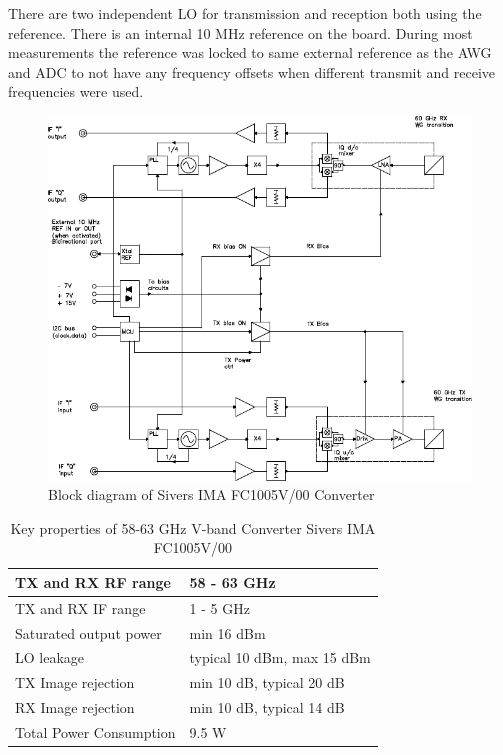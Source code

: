There are two independent \gls{LO} for transmission and reception both using
the reference. There is an internal 10 MHz reference on the board. During
most measurements the reference was locked to same external reference as the
\gls{AWG} and \gls{ADC} to not have any frequency offsets when different
transmit and receive frequencies were used.

\begin{figure}
  \centering
  \includegraphics[width=\textwidth]{figures/sivers_block_diagram}
  \caption{Block diagram of Sivers IMA FC1005V/00 Converter}
  \label{fig:sivers}
\end{figure}

\begin{table}[h]
  \centering
  \begin{tabular}{|l|l|}
    \hline
    \acrshort{TX} and \acrshort{RX} \gls{RF} range & 58 - 63 GHz \\ \hline
    \acrshort{TX} and \acrshort{RX} \gls{IF} range & 1 - 5 GHz \\ \hline
    Saturated output power & min 16 dBm \\ \hline
    \gls{LO} leakage & typical 10 dBm, max 15 dBm \\ \hline
    \acrshort{TX} Image rejection & min 10 dB, typical 20 dB \\ \hline
    \acrshort{RX} Image rejection & min 10 dB, typical 14 dB \\ \hline
    Total Power Consumption & 9.5 W \\ \hline
  \end{tabular}
  \caption{Key properties of 58-63 GHz V-band Converter Sivers IMA FC1005V/00}
  \label{tab:awg}
\end{table}

